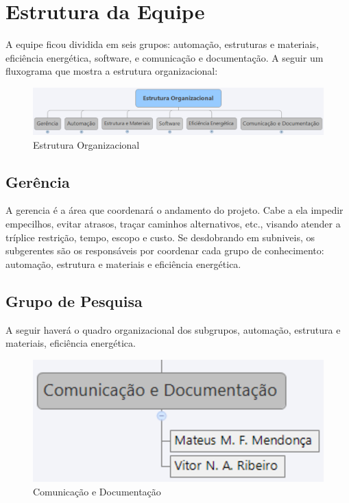 \section{Estrutura da Equipe}

	A equipe ficou dividida em seis grupos: automação, estruturas e materiais, eficiência energética, software, e comunicação e documentação. A seguir um fluxograma que mostra a estrutura organizacional:

\begin{figure}[H]
  \begin{center}
	\includegraphics[keepaspectratio,scale=0.5]{figuras/estrutura_organizacional.eps}
	\caption{Estrutura Organizacional}
  \end{center}
\end{figure}

\subsection{Gerência}

	A gerencia é a área que coordenará o andamento do projeto. Cabe a ela impedir empecilhos, evitar atrasos, traçar caminhos alternativos, etc., visando atender a tríplice restrição, tempo, escopo e custo. Se desdobrando em subniveis, os subgerentes são os responsáveis por coordenar cada grupo de conhecimento: automação, estrutura e materiais e eficiência energética.

\subsection{Grupo de Pesquisa}

	A seguir haverá o quadro organizacional dos subgrupos, automação, estrutura e materiais, eficiência energética.

\begin{figure}[H]
  \begin{center}
	\includegraphics[keepaspectratio,scale=0.6]{figuras/comunicacao_documentacao.eps}
	\caption{Comunicação e Documentação}
  \end{center}
\end{figure}

